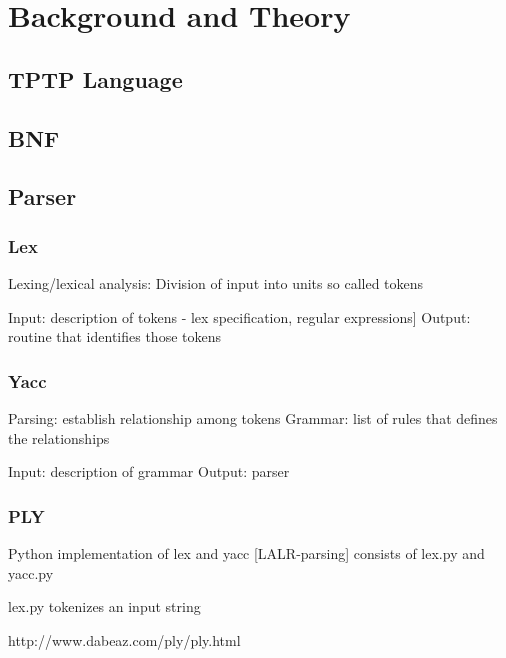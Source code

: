 
\chapter{Background and Theory}\label{cha:Background}

\section{TPTP Language}\label{sec:BackgroundTPTP}
\cite{Sut17}

\section{\acf{BNF}}\label{sec:BackgroundBNF}

\section{Parser}\label{sec:BackgroundParser}

\subsection{Lex}\label{sec:Back groundLex}

Lexing/lexical analysis: Division of input into units so called tokens \cite{LexYacc.1992}

Input: description of tokens - lex specification, regular expressions]\cite{LexYacc.1992}
Output: routine that identifies those tokens \cite{LexYacc.1992}

\subsection{Yacc}\label{sec:BackgroundYacc}

Parsing: establish relationship among tokens \cite{LexYacc.1992}
Grammar: list of rules that defines the relationships \cite{LexYacc.1992}

Input: description of grammar \cite{LexYacc.1992}
Output: parser \cite{LexYacc.1992}


\subsection{PLY}\label{sec:BackgroundPLY}

Python implementation of lex and yacc
[LALR-parsing]
consists of lex.py and yacc.py

lex.py tokenizes an input string

http://www.dabeaz.com/ply/ply.html